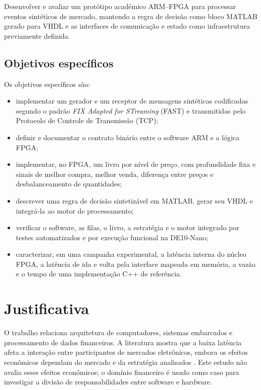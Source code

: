 Desenvolver e avaliar um protótipo acadêmico ARM--FPGA para processar eventos sintéticos de mercado, mantendo a regra de decisão como bloco MATLAB gerado para VHDL e as interfaces de comunicação e estado como infraestrutura previamente definida.

\subsection{Objetivos específicos}\label{subsec:objetivosEspecificos}

Os objetivos específicos são:

\begin{itemize}
  \item implementar um gerador e um receptor de mensagens sintéticas codificadas segundo o padrão \textit{FIX Adapted for STreaming} (FAST) e transmitidas pelo Protocolo de Controle de Transmissão (TCP);
  \item definir e documentar o contrato binário entre o software ARM e a lógica FPGA;
  \item implementar, no FPGA, um livro por nível de preço, com profundidade fixa e sinais de melhor compra, melhor venda, diferença entre preços e desbalanceamento de quantidades;
  \item descrever uma regra de decisão sintetizável em MATLAB, gerar seu VHDL e integrá-la ao motor de processamento;
  \item verificar o software, as filas, o livro, a estratégia e o motor integrado por testes automatizados e por execução funcional na DE10-Nano;
  \item caracterizar, em uma campanha experimental, a latência interna do núcleo FPGA, a latência de ida e volta pela interface mapeada em memória, a vazão e o tempo de uma implementação C++ de referência.
\end{itemize}

\section{Justificativa}\label{sec:justificativa}

O trabalho relaciona arquitetura de computadores, sistemas embarcados e processamento de dados financeiros. A literatura mostra que a baixa latência afeta a interação entre participantes de mercados eletrônicos, embora os efeitos econômicos dependam do mercado e da estratégia analisados \cite{Hendershott2011,Brogaard2014,HasbrouckSaar2013}. Este estudo não avalia esses efeitos econômicos; o domínio financeiro é usado como caso para investigar a divisão de responsabilidades entre software e hardware.

